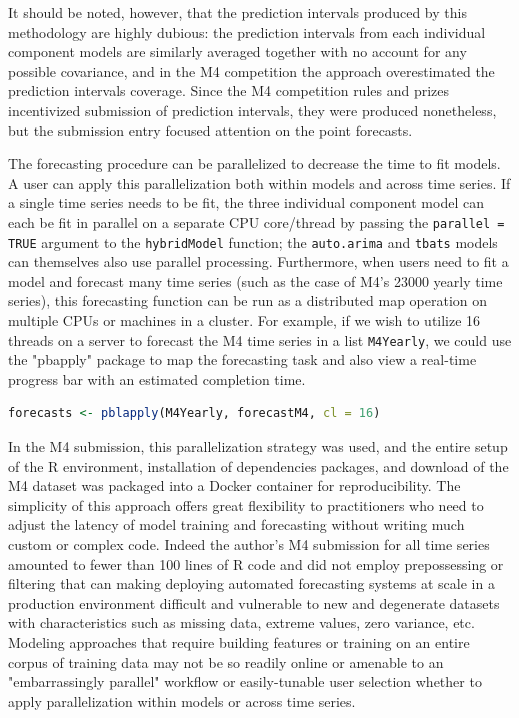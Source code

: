 \documentclass[11pt,3p,review,authoryear]{elsarticle}
\begin{document}
It should be noted, however, that the prediction intervals produced by this methodology are highly dubious: the prediction intervals from each individual component models are similarly averaged together with no account for any possible covariance, and in the M4 competition the approach overestimated the prediction intervals coverage. Since the M4 competition rules and prizes incentivized submission of prediction intervals, they were produced nonetheless, but the submission entry focused attention on the point forecasts.


The forecasting procedure can be parallelized to decrease the time to fit models. A user can apply this parallelization both within models and across time series. If a single time series needs to be fit, the three individual component model can each be fit in parallel on a separate CPU core/thread by passing the \texttt{parallel = TRUE} argument to the \texttt{hybridModel} function; the \texttt{auto.arima} and \texttt{tbats} models can themselves also use parallel processing. Furthermore, when users need to fit a model and forecast many time series (such as the case of M4's 23000 yearly time series), this forecasting function can be run as a distributed map operation on multiple CPUs or machines in a cluster. For example, if we wish to utilize 16 threads on a server to forecast the M4 time series in a list \texttt{M4Yearly}, we could use the "pbapply" package \citep{pbapply} to map the forecasting task and also view a real-time progress bar with an estimated completion time.

\begin{lstlisting}[language=R]
forecasts <- pblapply(M4Yearly, forecastM4, cl = 16)
\end{lstlisting}


In the M4 submission, this parallelization strategy was used, and the entire setup of the R environment, installation of dependencies packages, and download of the M4 dataset was packaged into a Docker container for reproducibility. The simplicity of this approach offers great flexibility to practitioners who need to adjust the latency of model training and forecasting without writing much custom or complex code. Indeed the author's M4 submission for all time series amounted to fewer than 100 lines of R code and did not employ prepossessing or filtering that can making deploying automated forecasting systems at scale in a production environment difficult and vulnerable to new and degenerate datasets with characteristics such as missing data, extreme values, zero variance, etc. Modeling approaches that require building features or training on an entire corpus of training data may not be so readily online or amenable to an "embarrassingly parallel" workflow or easily-tunable user selection whether to apply parallelization within models or across time series.
\end{document}

